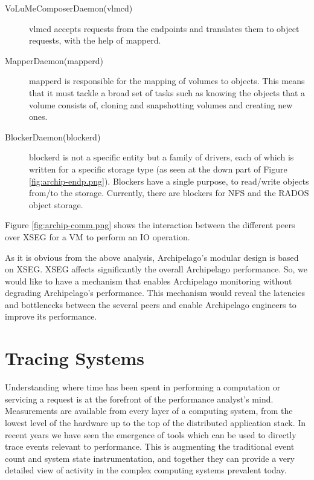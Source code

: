 \begin{description}

\item[VoLuMeComposerDaemon(vlmcd)]
vlmcd accepts requests from the endpoints and translates them to object
requests, with the help of mapperd.

\item[MapperDaemon(mapperd)]
mapperd is responsible for the mapping of volumes to objects. This means that it
must tackle a broad set of tasks such as knowing the objects that a volume
consists of, cloning and snapshotting volumes and creating new ones.

\item[BlockerDaemon(blockerd)]
blockerd is not a specific entity but a family of drivers, each of which is
written for a specific storage type (as seen at the down part of Figure
\ref{fig:archip-endp.png}). Blockers have a single purpose, to read/write
objects from/to the storage. Currently, there are blockers for NFS and the RADOS
object storage.

\end{description} 

Figure \ref{fig:archip-comm.png} shows the interaction between the different
peers over XSEG for a VM to perform an IO operation.


As it is obvious from the above analysis, Archipelago's modular design is based
on XSEG. XSEG affects significantly the overall Archipelago performance. So, we
would like to have a mechanism that enables Archipelago monitoring without
degrading Archipelago's performance. This mechanism would reveal the latencies
and bottlenecks between the several peers and enable Archipelago engineers to
improve its performance.

\section{Tracing Systems}\label{sec:tracing-bkg}
Understanding where time has been spent in performing a computation or servicing
a request is at the forefront of the performance analyst's mind. Measurements
are available from every layer of a computing system, from the lowest level of
the hardware up to the top of the distributed application stack. In recent years
we have seen the emergence of tools which can be used to directly trace events
relevant to performance. This is augmenting the traditional event count and
system state instrumentation, and together they can provide a very detailed view
of activity in the complex computing systems prevalent today.

